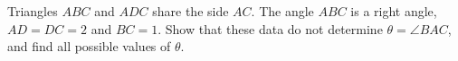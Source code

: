 Triangles $ABC$ and $ADC$ share the side $AC$. The angle $ABC$ is a right angle, $AD=DC=2$ and $BC=1$. Show that these data do not determine $\theta=\angle BAC$, and find all possible values of $\theta$.
